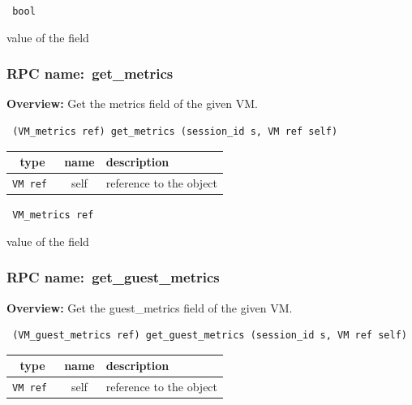 \vspace{0.3cm}

{\tt 
bool
}


value of the field
\vspace{0.3cm}
\vspace{0.3cm}
\vspace{0.3cm}
\subsubsection{RPC name:~get\_metrics}

{\bf Overview:} 
Get the metrics field of the given VM.

\begin{verbatim} (VM_metrics ref) get_metrics (session_id s, VM ref self)\end{verbatim}



 
\vspace{0.3cm}
\begin{tabular}{|c|c|p{7cm}|}
 \hline
{\bf type} & {\bf name} & {\bf description} \\ \hline
{\tt VM ref } & self & reference to the object \\ \hline 

\end{tabular}

\vspace{0.3cm}

{\tt 
VM\_metrics ref
}


value of the field
\vspace{0.3cm}
\vspace{0.3cm}
\vspace{0.3cm}
\subsubsection{RPC name:~get\_guest\_metrics}

{\bf Overview:} 
Get the guest\_metrics field of the given VM.

\begin{verbatim} (VM_guest_metrics ref) get_guest_metrics (session_id s, VM ref self)\end{verbatim}



 
\vspace{0.3cm}
\begin{tabular}{|c|c|p{7cm}|}
 \hline
{\bf type} & {\bf name} & {\bf description} \\ \hline
{\tt VM ref } & self & reference to the object \\ \hline 

\end{tabular}

